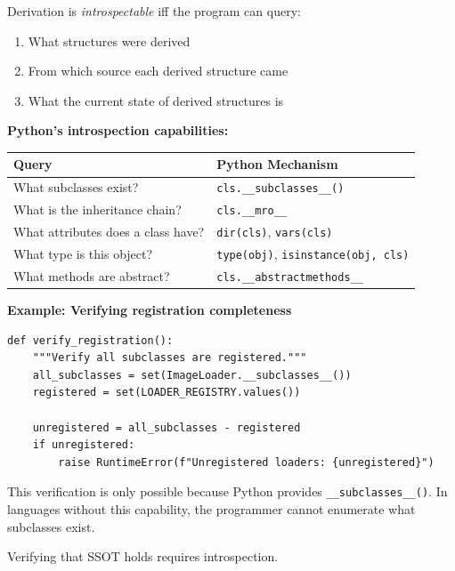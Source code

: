 \begin{definition}\label{def:introspection}
Derivation is \emph{introspectable} iff the program can query:
\begin{enumerate}
\tightlist
\item What structures were derived
\item From which source each derived structure came
\item What the current state of derived structures is
\end{enumerate}
\end{definition}

\textbf{Python's introspection capabilities:}

\begin{center}
\begin{tabular}{lp{7cm}}
\toprule
\textbf{Query} & \textbf{Python Mechanism} \\
\midrule
What subclasses exist? & \texttt{cls.\_\_subclasses\_\_()} \\
What is the inheritance chain? & \texttt{cls.\_\_mro\_\_} \\
What attributes does a class have? & \texttt{dir(cls)}, \texttt{vars(cls)} \\
What type is this object? & \texttt{type(obj)}, \texttt{isinstance(obj, cls)} \\
What methods are abstract? & \texttt{cls.\_\_abstractmethods\_\_} \\
\bottomrule
\end{tabular}
\end{center}

\textbf{Example: Verifying registration completeness}

\begin{verbatim}
def verify_registration():
    """Verify all subclasses are registered."""
    all_subclasses = set(ImageLoader.__subclasses__())
    registered = set(LOADER_REGISTRY.values())

    unregistered = all_subclasses - registered
    if unregistered:
        raise RuntimeError(f"Unregistered loaders: {unregistered}")
\end{verbatim}

This verification is only possible because Python provides \texttt{\_\_subclasses\_\_()}. In languages without this capability, the programmer cannot enumerate what subclasses exist.

\begin{theorem}\label{thm:introspection-necessary}
Verifying that SSOT holds requires introspection.
\end{theorem}

